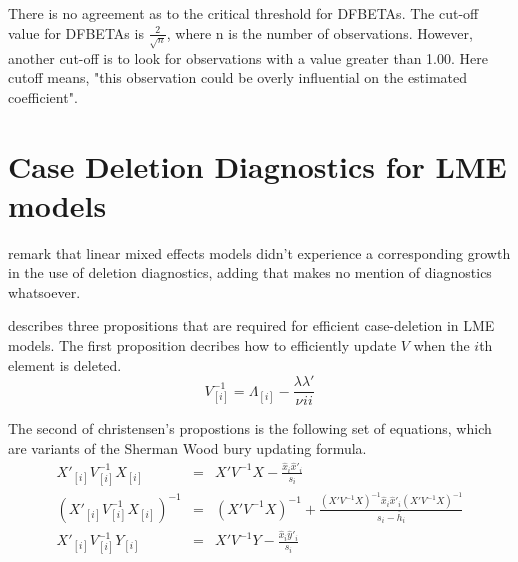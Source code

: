 \documentclass[12pt, a4paper]{report}
\theoremstyle{plain}
\theoremstyle{definition}
\theoremstyle{remark}
\begin{document}




There is no agreement as to the critical threshold for DFBETAs. The cut-off value for DFBETAs is $\frac{2}{\sqrt{n}}$, where n is the number of observations. 
However, another cut-off is to look for observations with a value greater than 1.00. Here cutoff means, 
"this observation could be overly influential on the estimated coefficient".
\newpage


\section{Case Deletion Diagnostics for LME models}

\citet{HaslettDillane} remark that linear mixed effects models
didn't experience a corresponding growth in the use of deletion
diagnostics, adding that \citet{McCullSearle} makes no mention of
diagnostics whatsoever.

\citet{Christensen} describes three propositions that are required
for efficient case-deletion in LME models. The first proposition
decribes how to efficiently update $V$ when the $i$th element is
deleted.
\begin{equation}
V_{[i]}^{-1} = \Lambda_{[i]} - \frac{\lambda
	\lambda\prime}{\nu^{}ii}
\end{equation}


The second of christensen's propostions is the following set of
equations, which are variants of the Sherman Wood bury updating
formula.
\begin{eqnarray}
X'_{[i]}V_{[i]}^{-1}X_{[i]} &=& X' V^{-1}X -
\frac{\hat{x}_{i}\hat{x}'_{i}}{s_{i}}\\
(X'_{[i]}V_{[i]}^{-1}X_{[i]})^{-1} &=& (X' V^{-1}X)^{-1} +
\frac{(X' V^{-1}X)^{-1}\hat{x}_{i}\hat{x}' _{i}
	(X' V^{-1}X)^{-1}}{s_{i}- \bar{h}_{i}}\\
X'_{[i]}V_{[i]}^{-1}Y_{[i]} &=& X\prime V^{-1}Y -
\frac{\hat{x}_{i}\hat{y}' _{i}}{s_{i}}
\end{eqnarray}
\end{document}
